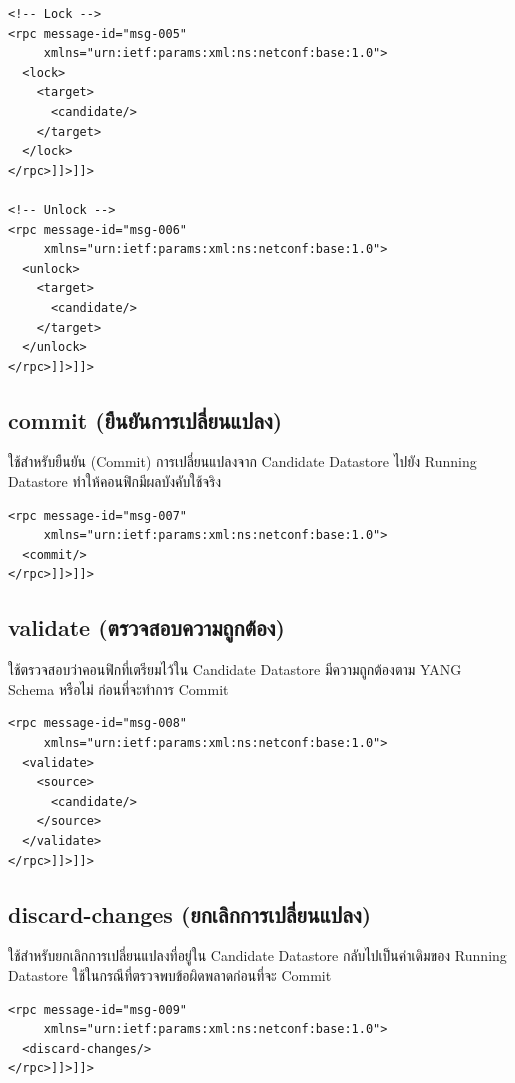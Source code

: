 \begin{verbatim}
<!-- Lock -->
<rpc message-id="msg-005"
     xmlns="urn:ietf:params:xml:ns:netconf:base:1.0">
  <lock>
    <target>
      <candidate/>
    </target>
  </lock>
</rpc>]]>]]>

<!-- Unlock -->
<rpc message-id="msg-006"
     xmlns="urn:ietf:params:xml:ns:netconf:base:1.0">
  <unlock>
    <target>
      <candidate/>
    </target>
  </unlock>
</rpc>]]>]]>
\end{verbatim}

\subsection{commit (ยืนยันการเปลี่ยนแปลง)}
\hspace*{1.3em}
ใช้สำหรับยืนยัน (Commit) การเปลี่ยนแปลงจาก Candidate Datastore ไปยัง Running Datastore ทำให้คอนฟิกมีผลบังคับใช้จริง

\begin{verbatim}
<rpc message-id="msg-007"
     xmlns="urn:ietf:params:xml:ns:netconf:base:1.0">
  <commit/>
</rpc>]]>]]>
\end{verbatim}

\subsection{validate (ตรวจสอบความถูกต้อง)}
\hspace*{1.3em}
ใช้ตรวจสอบว่าคอนฟิกที่เตรียมไว้ใน Candidate Datastore มีความถูกต้องตาม YANG Schema หรือไม่ ก่อนที่จะทำการ Commit

\begin{verbatim}
<rpc message-id="msg-008"
     xmlns="urn:ietf:params:xml:ns:netconf:base:1.0">
  <validate>
    <source>
      <candidate/>
    </source>
  </validate>
</rpc>]]>]]>
\end{verbatim}

\subsection{discard-changes (ยกเลิกการเปลี่ยนแปลง)}
\hspace*{1.3em}
ใช้สำหรับยกเลิกการเปลี่ยนแปลงที่อยู่ใน Candidate Datastore กลับไปเป็นค่าเดิมของ Running Datastore ใช้ในกรณีที่ตรวจพบข้อผิดพลาดก่อนที่จะ Commit

\begin{verbatim}
<rpc message-id="msg-009"
     xmlns="urn:ietf:params:xml:ns:netconf:base:1.0">
  <discard-changes/>
</rpc>]]>]]>
\end{verbatim}

